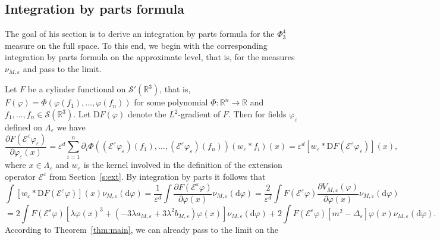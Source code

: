 \documentclass[a4paper,11pt]{article}
\newcommand{\mathD}{\mathrm{D}}
\newcommand{\mathd}{\mathrm{d}}
\numberwithin{equation}{section}
\begin{document}
\subsection{Integration by parts formula}

The goal of his section is to derive an integration by parts formula for the
$\Phi^4_3$ measure on the full space. To this end, we begin with the
corresponding integration by parts formula on the approximate level, that is,
for the measures $\nu_{M, \varepsilon}$ and pass to the limit.

Let $F$ be a cylinder functional on $\mathcal{S}' (\mathbb{R}^3)$, that is, $F
(\varphi) = \Phi (\varphi (f_1), \ldots, \varphi (f_n))$ for some polynomial $\Phi :
\mathbb{R}^n \rightarrow \mathbb{R}$ and $f_1, \ldots, f_n \in \mathcal{S}
(\mathbb{R}^3)$. Let $\mathD F (\varphi)$ denote the $L^2$-gradient of $F$.
Then  for fields $\varphi_{\varepsilon}$ defined on
$\Lambda_{\varepsilon}$ we have
\[ \frac{\partial F (\mathcal{E}^{\varepsilon}
   \varphi_{\varepsilon})}{\partial \varphi_{\varepsilon} (x)} = \varepsilon^d
   \sum_{i = 1}^n \partial_i \Phi ((\mathcal{E}^{\varepsilon}
   \varphi_{\varepsilon}) (f_1), \ldots, (\mathcal{E}^{\varepsilon}
   \varphi_{\varepsilon}) (f_n)) (w_{\varepsilon} \ast f_i) (x) =
   \varepsilon^d [w_{\varepsilon} \ast \mathD F (\mathcal{E}^{\varepsilon}
   \varphi_{\varepsilon})] (x), \]
where $x\in \Lambda_{\varepsilon}$ and $w_{\varepsilon}$ is the kernel involved in the definition of the
extension operator $\mathcal{E}^{\varepsilon}$ from Section~\ref{s:ext}. By integration by parts it
follows that
\[ \int [w_{\varepsilon} \ast \mathD F (\mathcal{E}^{\varepsilon} \varphi)]
   (x) \nu_{M, \varepsilon} (\mathd \varphi) = \frac{1}{\varepsilon^d} \int
   \frac{\partial F (\mathcal{E}^{\varepsilon} \varphi)}{\partial \varphi (x)}
   \nu_{M, \varepsilon} (\mathd \varphi) = \frac{2}{\varepsilon^d} \int F
   (\mathcal{E}^{\varepsilon} \varphi) \frac{\partial V_{M, \varepsilon}
   (\varphi)}{\partial \varphi (x)} \nu_{M, \varepsilon} (\mathd \varphi) \]
\begin{equation}
  = 2 \int F (\mathcal{E}^{\varepsilon} \varphi) [\lambda \varphi (x)^3 + (- 3\lambda a_{M,
  \varepsilon} + 3\lambda^2 b_{M, \varepsilon}) \varphi (x)] \nu_{M, \varepsilon}
  (\mathd \varphi) + 2 \int F (\mathcal{E}^{\varepsilon} \varphi) [m^2 -
  \Delta_{\varepsilon}] \varphi (x) \nu_{M, \varepsilon} (\mathd \varphi) .
  \label{eq:ibp1}
\end{equation}
According to Theorem~\ref{thm:main}, we can already pass to the limit on the
\end{document}
